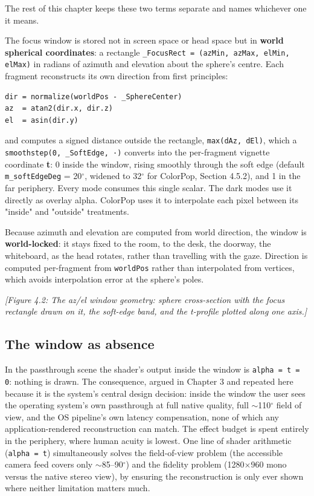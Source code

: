 The rest of this chapter keeps these two terms separate and names whichever one it means.

The focus window is stored not in screen space or head space but in \textbf{world spherical
coordinates}: a rectangle
\verb|_FocusRect = (azMin, azMax, elMin, elMax)| in radians of azimuth and elevation about the sphere's
centre. Each fragment reconstructs its own direction from first principles:

\begin{verbatim}
dir = normalize(worldPos - _SphereCenter)
az  = atan2(dir.x, dir.z)
el  = asin(dir.y)
\end{verbatim}

and computes a signed distance outside the rectangle, \verb|max(dAz, dEl)|, which a
\verb|smoothstep(0, _SoftEdge, ·)| converts into the per-fragment vignette coordinate \textbf{t}: 0 inside
the window, rising smoothly through the soft edge (default \verb|m_softEdgeDeg| = 20$^{\circ}$, widened to 32$^{\circ}$
for ColorPop, Section 4.5.2), and 1 in the far periphery. Every mode consumes this single scalar.
The dark modes use it directly as overlay alpha. ColorPop uses it to interpolate each pixel between
its "inside" and "outside" treatments.

Because azimuth and elevation are computed from world direction, the window is \textbf{world-locked}: it
stays fixed to the room, to the desk, the doorway, the whiteboard, as the head rotates, rather
than travelling with the gaze. Direction is computed per-fragment from \verb|worldPos| rather than
interpolated from vertices, which avoids interpolation error at the sphere's poles.

\textit{[Figure 4.2: The az/el window geometry: sphere cross-section with the focus rectangle drawn on it,
the soft-edge band, and the t-profile plotted along one axis.]}

\subsection{The window as absence}

In the passthrough scene the shader's output inside the window is \verb|alpha = t = 0|: nothing is drawn.
The consequence, argued in Chapter 3 and repeated here because it is the system's central design
decision: inside the window the user sees the operating system's own passthrough at full native
quality, full $\sim$110$^{\circ}$ field of view, and the OS pipeline's own latency compensation, none of which
any application-rendered reconstruction can match. The effect budget is spent entirely in the
periphery, where human acuity is lowest. One line of shader arithmetic (\verb|alpha = t|) simultaneously
solves the field-of-view problem (the accessible camera feed covers only $\sim$85–90$^{\circ}$) and the fidelity
problem (1280$\times$960 mono versus the native stereo view), by ensuring the reconstruction is only ever
shown where neither limitation matters much.

